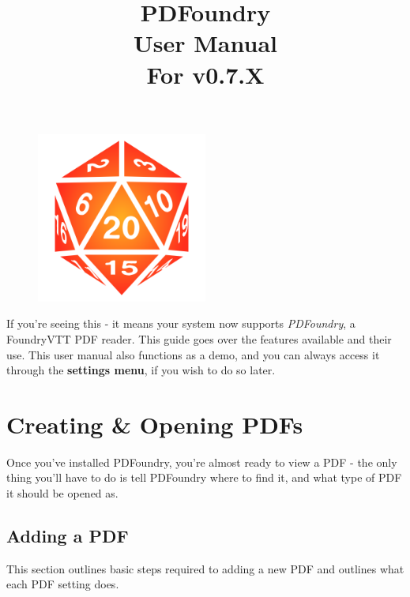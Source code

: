 \documentclass{article}
\title{%
PDFoundry \\
\large User Manual\\
For v0.7.X}
\date{}
\author{}
\begin{document}
    \begin{figure}[t]
        \centering
        \includegraphics[width=0.5\textwidth]{images/fvtt-d20.png}
    \end{figure}
    \maketitle

    If you're seeing this - it means your system now supports \textit{PDFoundry}, a FoundryVTT PDF reader. This guide goes over the features available and their use. This user manual also functions as a demo, and you can always access it through the \textbf{settings menu}, if you wish to do so later.

    \tableofcontents

    \section{Creating \& Opening PDFs}
    \label{sec:creating-opening-pdfs}

    Once you've installed PDFoundry, you're almost ready to view a PDF - the only thing you'll have to do is tell PDFoundry where to find it, and what type of PDF it should be opened as.

    \subsection{Adding a PDF}
    This section outlines basic steps required to adding a new PDF and outlines what each PDF setting does.
\end{document}
